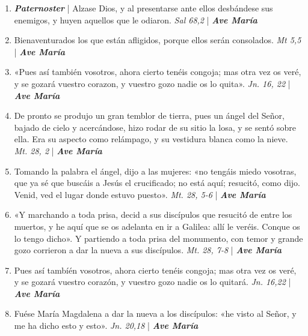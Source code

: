 \documentclass[../../devocionario.tex]{subfiles}
\begin{document}
    \begin{enumerate}
    
        \item \textbf{\textit{Paternoster}} | Alzase Dios, y al presentarse ante ellos desbándese sus enemigos, 
            y huyen aquellos que le odiaron. \textit{Sal 68,2} | \textbf{\textit{Ave María}}

        \item Bienaventurados los que están afligidos, porque ellos serán consolados. \textit{Mt 5,5} | \textbf{\textit{Ave María}}

        \item «Pues así también vosotros, ahora cierto tenéis congoja; mas otra vez os veré, y se gozará vuestro corazon, 
            y vuestro gozo nadie os lo quita». \textit{Jn. 16, 22} | \textbf{\textit{Ave María}}

        \item De pronto se produjo un gran temblor de tierra, pues un ángel del Señor, bajado de cielo y acercándose, 
            hizo rodar de su sitio la losa, y se sentó sobre ella. Era su aspecto como relámpago, 
            y su vestidura blanca como la nieve. \textit{Mt. 28, 2} | \textbf{\textit{Ave María}}

        \item Tomando la palabra el ángel, dijo a las mujeres: «no tengáis miedo vosotras, que ya sé que buscáis a Jesús el crucificado; 
            no está aquí; resucitó, como dijo. Venid, ved el lugar donde estuvo puesto». \textit{Mt. 28, 5-6} | \textbf{\textit{Ave María}}

        \item «Y marchando a toda prisa, decid a sus discípulos que resucitó de entre los muertos, 
            y he aquí que se os adelanta en ir a Galilea: allí le veréis. Conque os lo tengo dicho». 
            Y partiendo a toda prisa del monumento, con temor y grande gozo corrieron a dar la nueva a sus discípulos. \textit{Mt. 28, 7-8} | \textbf{\textit{Ave María}}

        \item Pues así tambíén vosotros, ahora cierto tenéis congoja; mas otra vez os veré, y se gozará vuestro corazón, 
            y vuestro gozo nadie os lo quitará. \textit{Jn. 16,22} | \textbf{\textit{Ave María}}

        \item Fuése María Magdalena a dar la nueva a los discípulos: «he visto al Señor, 
            y me ha dicho esto y esto». \textit{Jn. 20,18} | \textbf{\textit{Ave María}}


\end{enumerate}
\end{document}
